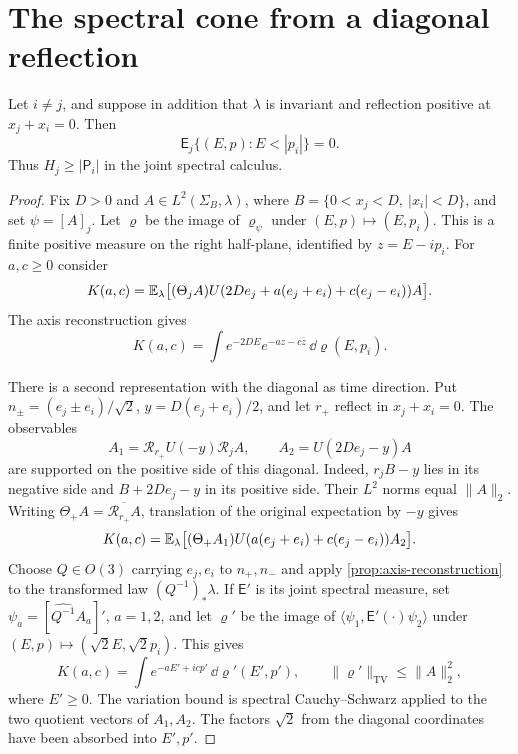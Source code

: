 \section{The spectral cone from a diagonal reflection}\label{sec:cone}

\begin{proposition}\label{prop:diagonal-cone}
Let $i\ne j$, and suppose in addition that $\lambda$ is invariant
and reflection positive at $x_j+x_i=0$. Then
\begin{equation}\label{eq:sharp-coordinate-cone}
 \mathsf E_j\{(E,p):E<|p_i|\}=0.
\end{equation}
Thus $H_j\ge|\mathsf P_i|$ in the joint spectral calculus.
\end{proposition}

\begin{proof}
Fix $D>0$ and $A\in L^2(\Sigma_B,\lambda)$, where
$B=\{0<x_j<D,\ |x_i|<D\}$, and set $\psi=[A]_j$.
Let $\varrho$ be the image of $\varrho_\psi$ under
$(E,p)\mapsto(E,p_i)$. This is a finite positive measure on the
right half-plane, identified by $z=E-ip_i$.
For $a,c\ge0$ consider
\[
 K(a,c)=\mathbb E_\lambda\bigl[(\Theta_j A)
 U(2De_j+a(e_j+e_i)+c(e_j-e_i))A\bigr].
\]
The axis reconstruction gives
\begin{equation}\label{eq:cone-first-picture}
 K(a,c)=\int e^{-2DE}e^{-az-c\overline z}\,\dd\varrho(E,p_i).
\end{equation}

There is a second representation with the diagonal as time direction.
Put $n_\pm=(e_j\pm e_i)/\sqrt2$, $y=D(e_j+e_i)/2$, and let
$r_+$ reflect in $x_j+x_i=0$. The observables
\[
 A_1=\mathcal R_{r_+}U(-y)\mathcal R_j A,
 \qquad A_2=U(2De_j-y)A
\]
are supported on the positive side of this diagonal. Indeed,
$r_jB-y$ lies in its negative side and $B+2De_j-y$ in its positive
side. Their $L^2$ norms equal $\|A\|_2$.
Writing $\Theta_+A=\overline{\mathcal R_{r_+}A}$, translation of
the original expectation by $-y$ gives
\[
 K(a,c)=\mathbb E_\lambda\bigl[(\Theta_+A_1)
 U(a(e_j+e_i)+c(e_j-e_i))A_2\bigr].
\]
Choose $Q\in O(3)$ carrying $e_j,e_i$ to $n_+,n_-$ and apply
\cref{prop:axis-reconstruction} to the transformed law
$(Q^{-1})_*\lambda$. If $\mathsf E'$ is its joint spectral measure,
set $\psi_a=[\widehat{Q^{-1}}A_a]'$, $a=1,2$, and let
$\varrho'$ be the image of
$\langle\psi_1,\mathsf E'(\cdot)\psi_2\rangle$
under $(E,p)\mapsto(\sqrt2E,\sqrt2p_i)$. This gives
\begin{equation}\label{eq:cone-second-picture}
 K(a,c)=\int e^{-aE'+icp'}\,\dd\varrho'(E',p'),
 \qquad \|\varrho'\|_{\mathrm{TV}}\le\|A\|_2^2,
\end{equation}
where $E'\ge0$. The variation bound is spectral
Cauchy--Schwarz applied to the two quotient vectors of $A_1,A_2$.
The factors $\sqrt2$ from the diagonal coordinates have been absorbed
into $E',p'$.


\end{proof}
